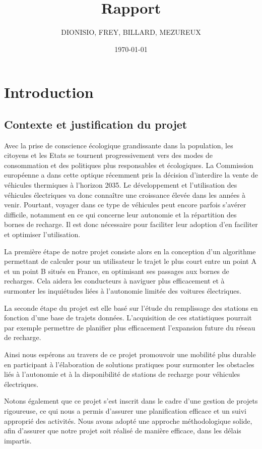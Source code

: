 \documentclass[a4paper, 12pt]{report}
\title{Rapport}
\author{DIONISIO, FREY, BILLARD, MEZUREUX}
\date{\today}
\begin{document}
\maketitle
\dominitoc
{}
\tableofcontents

\chapter{Introduction}
\minitoc
{}
\clearpage
    \section{Contexte et justification du projet}
Avec la prise de conscience écologique grandissante dans la population, les citoyens et les Etats se tournent progressivement vers des modes de consommation et des politiques plus responsables et écologiques. La Commission européenne a dans cette optique récemment pris la décision d'interdire la vente de véhicules thermiques à l'horizon 2035. Le développement et l'utilisation des véhicules électriques va donc connaître une croissance élevée dans les années à venir. Pourtant, voyager dans ce type de véhicules peut encore parfois s'avérer difficile, notamment en ce qui concerne leur autonomie et la répartition des bornes de recharge. Il est donc nécessaire pour faciliter leur adoption d'en faciliter et optimiser l'utilisation.
\bigskip

La première étape de notre projet consiste alors en la conception d'un algorithme permettant de calculer pour un utilisateur le trajet le plus court entre un point A et un point B situés en France, en optimisant ses passages aux bornes de recharges. Cela aidera les conducteurs à naviguer plus efficacement et à surmonter les inquiétudes liées à l'autonomie limitée des voitures électriques.
\bigskip

La seconde étape du projet est elle basé sur l'étude du remplissage des stations en fonction d'une base de trajets données. L'acquisition de ces statistiques pourrait par exemple permettre de planifier plus efficacement l'expansion future du réseau de recharge.
\bigskip

Ainsi nous espérons au travers de ce projet promouvoir une mobilité plus durable en participant à l'élaboration de solutions pratiques pour surmonter les obstacles liés à l'autonomie et à la disponibilité de stations de recharge pour véhicules électriques.
\bigskip

Notons également que ce projet s'est inscrit dans le cadre d'une gestion de projets rigoureuse, ce qui nous a permis d'assurer une planification efficace et un suivi approprié des activités. Nous avons adopté une approche méthodologique solide, afin d'assurer que notre projet soit réalisé de manière efficace, dans les délais impartis.
\bigskip
\end{document}
